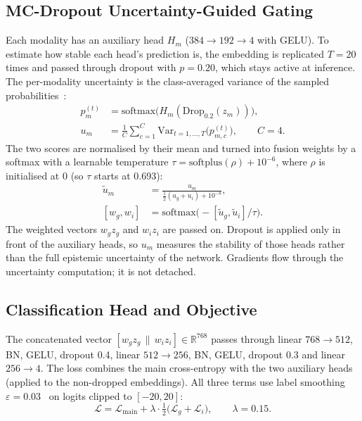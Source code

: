 \documentclass[journal,onecolumn]{IEEEtran}
\newcommand{\R}{\mathbb{R}}
\begin{document}
\subsection{MC-Dropout Uncertainty-Guided Gating}
Each modality has an auxiliary head $H_m$ ($384 \to 192 \to 4$ with GELU). To estimate how stable each head's prediction is, the embedding is replicated $T = 20$ times and passed through dropout with $p = 0.20$, which stays active at inference. The per-modality uncertainty is the class-averaged variance of the sampled probabilities~\cite{gal2016dropout}:
\begin{align}
p_m^{(t)} &= \mathrm{softmax}\big(H_m(\mathrm{Drop}_{0.2}(z_m))\big), \\
u_m &= \frac{1}{C} \sum_{c=1}^{C} \mathrm{Var}_{t=1,\dots,T}\big(p^{(t)}_{m,c}\big), \qquad C = 4.
\end{align}
The two scores are normalised by their mean and turned into fusion weights by a softmax with a learnable temperature $\tau = \mathrm{softplus}(\rho) + 10^{-6}$, where $\rho$ is initialised at 0 (so $\tau$ starts at 0.693):
\begin{align}
\tilde{u}_m &= \frac{u_m}{\tfrac{1}{2}(u_g + u_i) + 10^{-8}}, \\
[w_g, w_i] &= \mathrm{softmax}\big(-[\tilde{u}_g, \tilde{u}_i]/\tau\big).
\end{align}
The weighted vectors $w_g z_g$ and $w_i z_i$ are passed on. Dropout is applied only in front of the auxiliary heads, so $u_m$ measures the stability of those heads rather than the full epistemic uncertainty of the network. Gradients flow through the uncertainty computation; it is not detached.

\subsection{Classification Head and Objective}\label{sec:loss}
The concatenated vector $[w_g z_g \,\|\, w_i z_i] \in \R^{768}$ passes through linear $768 \to 512$, BN, GELU, dropout 0.4, linear $512 \to 256$, BN, GELU, dropout 0.3 and linear $256 \to 4$. The loss combines the main cross-entropy with the two auxiliary heads (applied to the non-dropped embeddings). All three terms use label smoothing $\varepsilon = 0.03$~\cite{szegedy2016inception} on logits clipped to $[-20, 20]$:
\begin{equation}
\mathcal{L} = \mathcal{L}_{\mathrm{main}} + \lambda \cdot \tfrac{1}{2}\big(\mathcal{L}_{g} + \mathcal{L}_{i}\big), \qquad \lambda = 0.15.
\end{equation}
\end{document}
